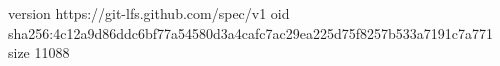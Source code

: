 version https://git-lfs.github.com/spec/v1
oid sha256:4c12a9d86ddc6bf77a54580d3a4cafc7ac29ea225d75f8257b533a7191c7a771
size 11088
